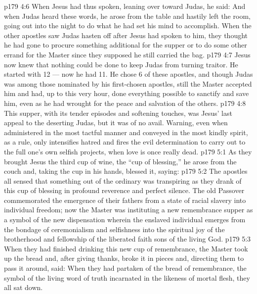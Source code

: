 \vs p179 4:6 When Jesus had thus spoken, leaning over toward Judas, he said:  And when Judas heard these words, he arose from the table and hastily left the room, going out into the night to do what he had set his mind to accomplish. When the other apostles saw Judas hasten off after Jesus had spoken to him, they thought he had gone to procure something additional for the supper or to do some other errand for the Master since they supposed he still carried the bag.
\vs p179 4:7 \pc Jesus now knew that nothing could be done to keep Judas from turning traitor. He started with 12 --- now he had 11. He chose 6 of these apostles, and though Judas was among those nominated by his first\hyp{}chosen apostles, still the Master accepted him and had, up to this very hour, done everything possible to sanctify and save him, even as he had wrought for the peace and salvation of the others.
\vs p179 4:8 This supper, with its tender episodes and softening touches, was Jesus’ last appeal to the deserting Judas, but it was of no avail. Warning, even when administered in the most tactful manner and conveyed in the most kindly spirit, as a rule, only intensifies hatred and fires the evil determination to carry out to the full one’s own selfish projects, when love is once really dead.
\vs p179 5:1 As they brought Jesus the third cup of wine, the “cup of blessing,” he arose from the couch and, taking the cup in his hands, blessed it, saying: 
\vs p179 5:2 The apostles all sensed that something out of the ordinary was transpiring as they drank of this cup of blessing in profound reverence and perfect silence. The old Passover commemorated the emergence of their fathers from a state of racial slavery into individual freedom; now the Master was instituting a new remembrance supper as a symbol of the new dispensation wherein the enslaved individual emerges from the bondage of ceremonialism and selfishness into the spiritual joy of the brotherhood and fellowship of the liberated faith sons of the living God.
\vs p179 5:3 When they had finished drinking this new cup of remembrance, the Master took up the bread and, after giving thanks, broke it in pieces and, directing them to pass it around, said:  When they had partaken of the bread of remembrance, the symbol of the living word of truth incarnated in the likeness of mortal flesh, they all sat down.
